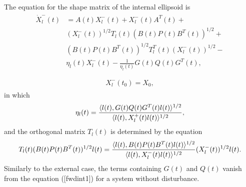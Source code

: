 \documentclass[letterpaper,10pt,english]{sphinxmanual}
\begin{document}
The equation for the shape matrix of the internal ellipsoid is
\label{main_source:equation-fwdint1}\begin{gather}
\begin{split}\dot{X}^-_l(t) & = A(t)X^-_l(t) + X^-_l(t)A^T(t) +\nonumber \\
& (X_l^{-}(t))^{1/2}T_l(t)(B(t)P(t)B^T(t))^{1/2} +\nonumber \\
& (B(t)P(t)B^T(t))^{1/2}T_l^T(t)(X_l^{-}(t))^{1/2} -\nonumber \\
& \eta_l(t)X^-_l(t) - \frac{1}{\eta_l(t)}G(t)Q(t)G^T(t), \\\end{split}\label{main_source-fwdint1}
\end{gather}\label{main_source:equation-fwdint2}\begin{gather}
\begin{split}X^-_l(t_0) = X_0,\end{split}\label{main_source-fwdint2}
\end{gather}
in which
\begin{gather}
\begin{split}\eta_l(t) = \frac{\langle l(t),
G(t)Q(t)G^T(t)l(t)\rangle^{1/2}}{\langle l(t), X^+_l(t)l(t)\rangle^{1/2}},\end{split}\notag
\end{gather}
and the orthogonal matrix $T_l(t)$ is determined by the equation
\begin{gather}
\begin{split}T_l(t)(B(t)P(t)B^T(t))^{1/2}l(t) = \frac{\langle l(t),
B(t)P(t)B^T(t)l(t)\rangle^{1/2}}{\langle l(t),
X_l^-(t)l(t)\rangle^{1/2}}(X_l^{-}(t))^{1/2}l(t).\end{split}\notag
\end{gather}
Similarly to the external case, the terms containing $G(t)$ and
$Q(t)$ vanish from the equation ({[}fwdint1{]}) for a system without
disturbance.
\end{document}
